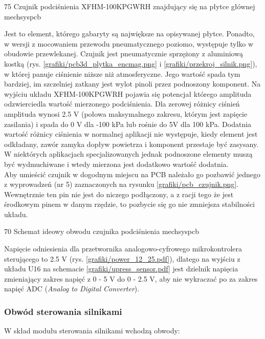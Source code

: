 	{75}
	{Czujnik podciśnienia XFHM-100KPGWRH znajdujący się na płytce głównej}
	{mechsyspcb}

Jest to element, którego gabaryty są największe na opisywanej płytce. Ponadto, w wersji z mocowaniem przewodu pneumatycznego poziomo, występuje tylko w obudowie przewlekanej. Czujnik jest pneumatycznie sprzężony z aluminiową kostką (rys. \ref{grafiki/pcb3d_plytka_encmag.png} i \ref{grafiki/przekroj_silnik.png}), w której panuje ciśnienie niższe niż atmosferyczne. Jego wartość spada tym bardziej, im szczelniej zatkany jest wylot pinoli przez podnoszony komponent. Na wyjściu układu XFHM-100KPGWRH pojawia się potencjał którego amplituda odzwierciedla wartość mierzonego podciśnienia. Dla zerowej różnicy ciśnień amplituda wynosi 2.5 V (połowa maksymalnego zakresu, którym jest zapięcie zasilania) i spada do 0 V dla -100 kPa lub rośnie do 5V dla 100 kPa. Dodatnia wartość różnicy ciśnienia w normalnej aplikacji nie występuje, kiedy element jest odkładany, zawór zamyka dopływ powietrza i komponent przestaje być zasysany. \linebreak W niektórych aplikacjach specjalizowanych jednak podnoszone elementy muszą być wydmuchiwane i wtedy mierzona jest dodatkowo wartość dodatnia. \\

Aby umieścić czujnik w dogodnym miejscu na PCB należało go pozbawić jednego z wyprowadzeń (nr 5) zaznaczonych na rysunku \ref{grafiki/pcb_czujnik.png}. Wewnętrznie ten pin nie jest do niczego podłączony, a z racji tego że jest środkowym pinem w danym rzędzie, to pozbycie się go nie zmniejsza stabilności układu.

	{70}
	{Schemat ideowy obwodu czujnika podciśnienia}
	{mechsyspcb}

Napięcie odniesienia dla przetwornika analogowo-cyfrowego mikrokontrolera sterującego to 2.5 V (rys. \ref{grafiki/power_12_25.pdf}), dlatego na wyjściu z układu U16 na schemacie \ref{grafiki/upress_sensor.pdf} jest dzielnik napięcia zmieniający zakres napięć z 0 - 5 V do 0 - 2.5 V, aby nie wykraczać po za zakres napięć ADC ({\it Analog to Digital Converter}).

\subsubsection{Obwód sterowania silnikami}
\label{sss:sterowanie_silnikami}

W skład modułu sterowania silnikami wchodzą obwody: \\

